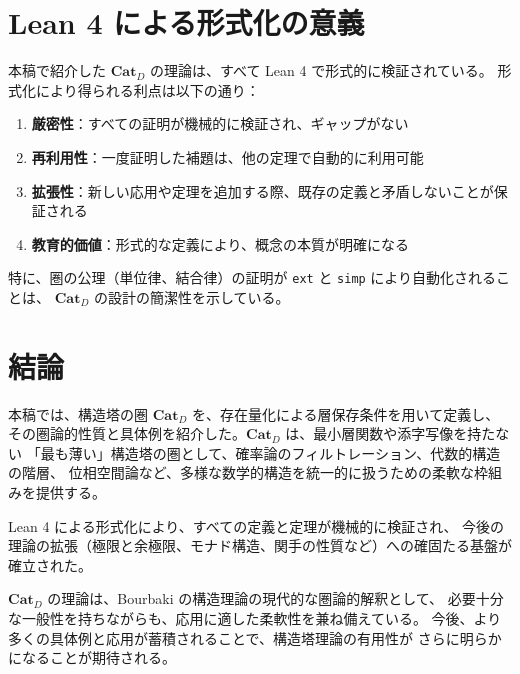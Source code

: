 \documentclass[a4paper,12pt]{ltjsarticle}
\begin{document}
\section{Lean 4 による形式化の意義}

本稿で紹介した $\mathbf{Cat}_D$ の理論は、すべて Lean 4 で形式的に検証されている。
形式化により得られる利点は以下の通り：

\begin{enumerate}
  \item \textbf{厳密性}：すべての証明が機械的に検証され、ギャップがない
  \item \textbf{再利用性}：一度証明した補題は、他の定理で自動的に利用可能
  \item \textbf{拡張性}：新しい応用や定理を追加する際、既存の定義と矛盾しないことが保証される
  \item \textbf{教育的価値}：形式的な定義により、概念の本質が明確になる
\end{enumerate}

特に、圏の公理（単位律、結合律）の証明が \texttt{ext} と \texttt{simp} により自動化されることは、
$\mathbf{Cat}_D$ の設計の簡潔性を示している。

\section{結論}

本稿では、構造塔の圏 $\mathbf{Cat}_D$ を、存在量化による層保存条件を用いて定義し、
その圏論的性質と具体例を紹介した。$\mathbf{Cat}_D$ は、最小層関数や添字写像を持たない
「最も薄い」構造塔の圏として、確率論のフィルトレーション、代数的構造の階層、
位相空間論など、多様な数学的構造を統一的に扱うための柔軟な枠組みを提供する。

Lean 4 による形式化により、すべての定義と定理が機械的に検証され、
今後の理論の拡張（極限と余極限、モナド構造、関手の性質など）への確固たる基盤が確立された。

$\mathbf{Cat}_D$ の理論は、Bourbaki の構造理論の現代的な圏論的解釈として、
必要十分な一般性を持ちながらも、応用に適した柔軟性を兼ね備えている。
今後、より多くの具体例と応用が蓄積されることで、構造塔理論の有用性が
さらに明らかになることが期待される。
\end{document}
